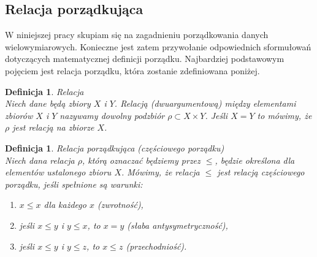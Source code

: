 \documentclass[12pt,a4paper]{report}
\newtheorem{definition}[theorem]{Definicja}
\begin{document}
\subsection{Relacja porządkująca}
\noindent

W niniejszej pracy skupiam się na zagadnieniu porządkowania danych wielowymiarowych. Konieczne jest zatem przywołanie odpowiednich sformułowań dotyczących matematycznej definicji porządku. Najbardziej podstawowym pojęciem jest relacja porządku, która zostanie zdefiniowana poniżej. 


\begin{definition}{Relacja \cite[Rozdział 3]{kuratowski2004}\\}
Niech dane będą zbiory $X$ i $Y$. Relacją (dwuargumentową) między elementami zbiorów $X$ i $Y$ nazywamy dowolny podzbiór $\rho \subset X \times Y $. Jeśli $X=Y$ to mówimy, że $\rho$ jest relacją na zbiorze $X$. \\
\end{definition} 

\begin{definition}{Relacja porządkująca (częściowego porządku) \cite[Rozdział 2]{blaszczyk2007}\\}\label{def-relacja-czesciowego-porzadku}
Niech dana relacja $\rho$, którą oznaczać będziemy przez $\leq$, będzie określona dla elementów ustalonego zbioru $X$. Mówimy, że relacja $\leq$ jest relacją częściowego porządku, jeśli spełnione są warunki:
\begin{enumerate}
\item $x \leq x$ dla każdego $x$ (zwrotność),
\item jeśli $x \leq y$ i $y \leq x$, to $x=y$ (słaba antysymetryczność),
\item jeśli $x \leq y$ i $y \leq z$, to $x \leq z$ (przechodniość).\\
\end{enumerate}
\end{definition}
\end{document}
